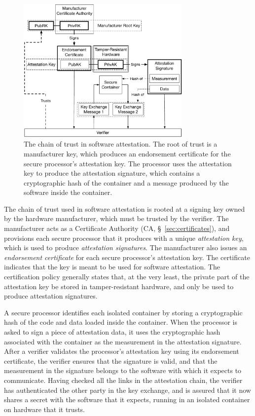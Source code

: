 \begin{figure}[hbt]
  \centering
  \includegraphics[width=85mm]{figures/generic_attestation_chain.pdf}
  \caption{
    The chain of trust in software attestation. The root of trust is a
    manufacturer key, which produces an endorsement certificate for the secure
    processor's attestation key. The processor uses the attestation key to
    produce the attestation signature, which contains a cryptographic hash of
    the container and a message produced by the software inside the container.
  }
  \label{fig:generic_attestation_chain}
\end{figure}

The chain of trust used in software attestation is rooted at a signing key
owned by the hardware manufacturer, which must be trusted by the verifier. The
manufacturer acts as a Certificate Authority (CA, \S~\ref{sec:certificates}),
and provisions each secure processor that it produces with a unique
\textit{attestation key}, which is used to produce
\textit{attestation signatures}. The manufacturer also
issues an \textit{endorsement certificate} for each secure processor's
attestation key. The certificate indicates that the key is meant to be used for
software attestation. The certification policy generally states that, at the
very least, the private part of the attestation key be stored in
tamper-resistant hardware, and only be used to produce attestation signatures.

A secure processor identifies each isolated container by storing a
cryptographic hash of the code and data loaded inside the container. When the
processor is asked to sign a piece of attestation data, it uses the
cryptographic hash associated with the container as the measurement in the
attestation signature. After a verifier validates the processor's attestation
key using its endorsement certificate, the verifier ensures that the signature
is valid, and that the measurement in the signature belongs to the software with
which it expects to communicate. Having checked all the links in the
attestation chain, the verifier has authenticated the other party in the key
exchange, and is assured that it now shares a secret with the software that it
expects, running in an isolated container on hardware that it trusts.


